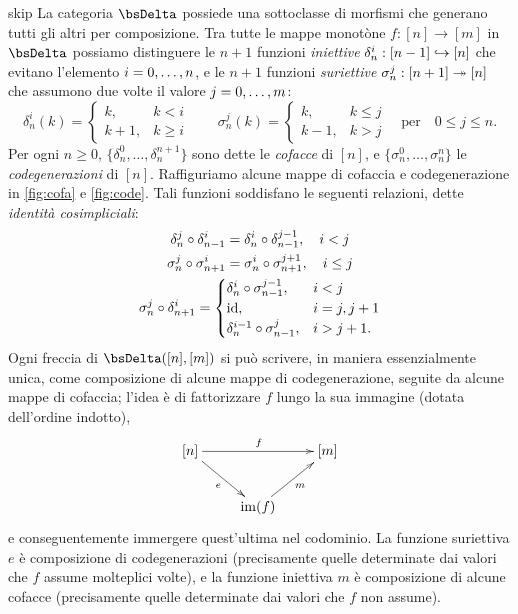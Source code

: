 \begin{hRemark}{skip}\label{rmk_combinatoria_simplessi}
	La categoria \(\bsDelta\) possiede una sottoclasse di morfismi che generano tutti gli altri per composizione. Tra tutte le mappe monotòne \(f : [n]\to [m]\) in \(\bsDelta\) possiamo distinguere le \(n+1\) funzioni \emph{iniettive} \(\delta_n^i : [n-1]\hookrightarrow [n]\) che evitano l'elemento \(i=\iter[0]n\), e le \(n+1\) funzioni \emph{suriettive} \(\sigma_n^j : [n+1]\twoheadrightarrow [n]\) che assumono due volte il valore  \(j=\iter[0]m\):
	\[
		\delta_n^i(k) =
		\begin{cases}
			k,   & k < i    \\
			k+1, & k \geq i
		\end{cases}
		\quad \quad
		\sigma_n^j (k) =
		\begin{cases}
			k,   & k \leq j \\
			k-1, & k > j
		\end{cases}
		\quad \text{per} \quad 0 \leq j\leq n.
	\]
	Per ogni \(n\ge 0\), \(\{\delta_n^0,\dots,\delta_n^{n+1}\}\) sono dette le \emph{cofacce} di \([n]\), e \(\{\sigma_n^0,\dots, \sigma_n^n\}\) le \emph{codegenerazioni} di \([n]\). Raffiguriamo alcune mappe di cofaccia e codegenerazione in \autoref{fig:cofa} e \ref{fig:code}. Tali funzioni soddisfano le seguenti relazioni, dette \emph{identità cosimpliciali}:
	\begin{gather*}
		\delta_n^j \circ \delta_{n-1}^i = \delta_n^i \circ \delta_{n-1}^{j-1}, \quad i < j\\
		\sigma_n^j \circ \sigma_{n+1}^i = \sigma_n^i \circ \sigma_{n+1}^{j+1}, \quad i \leq j\\
		\sigma_n^j \circ \delta_{n+1}^i =
		\begin{cases}
			\delta_n^i \circ \sigma_{n-1}^{j-1}, & i < j      \\
			\mathrm{id},                                & i = j, j+1 \\
			\delta_n^{i-1} \circ \sigma_{n-1}^j, & i > j+1.
		\end{cases}
	\end{gather*}
	Ogni freccia di \(\Hom\bsDelta([n],[m])\) si può scrivere, in maniera essenzialmente unica, come composizione di alcune mappe di codegenerazione, seguite da alcune mappe di cofaccia; l'idea è di fattorizzare \(f\) lungo la sua immagine (dotata dell'ordine indotto),
	\[\xymatrix{
			[n]\ar[rr]^f\ar[dr]_e &&	[m] \\
			& \im(f) \ar[ur]_m
		}\]
	e conseguentemente immergere quest'ultima nel codominio. La funzione suriettiva \(e\) è composizione di codegenerazioni (precisamente quelle determinate dai valori che \(f\) assume molteplici volte), e la funzione iniettiva \(m\) è composizione di alcune cofacce (precisamente quelle determinate dai valori che \(f\) non assume).
\end{hRemark}
